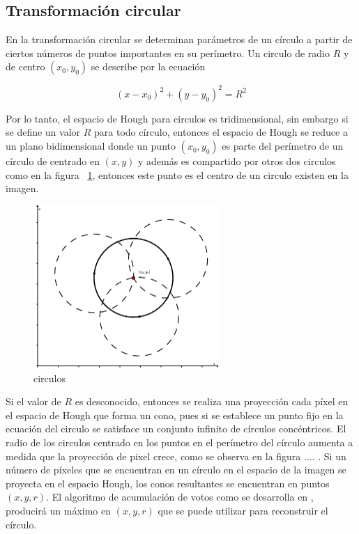 \subsection{Transformación circular}

En la transformación circular se determinan parámetros de un círculo a partir de ciertos números 
de puntos importantes en su perímetro. Un circulo de radio $R$ y de centro $(x_{0},y_{0})$ se describe por la ecuación 

\begin{equation}
(x-x_{0})^{2}+(y-y_{0})^{2}=R^{2}  
\end{equation}

Por lo tanto, el espacio de Hough para circulos es tridimensional, sin embargo si se define un valor $R$ para todo círculo, entonces el
espacio de Hough se reduce a un plano bidimensional donde un punto $(x_{0},y_{0})$ es parte del perímetro de un círculo de centrado en $(x,y)$ 
y además es compartido por otros dos circulos como en la figura ~\ref{fig:houghcircular}, entonces este punto es el centro de un circulo existen
en la imagen.

\begin{figure}[h]
 \centering
 \includegraphics[width=70mm]{./fig/houghcircular}
  \caption{circulos}
 \label{fig:houghcircular}
\end{figure}


Si el valor de $R$ es desconocido, entonces se realiza una proyección cada píxel en el espacio de Hough que forma un cono, pues si se establece un 
punto fijo en la ecuación del circulo se satisface un conjunto infinito de círculos concéntricos. El radio de los circulos centrado en los puntos
en el perímetro del círculo aumenta a medida que la proyección de pixel crece, como se observa en la figura .... .   Si un número de píxeles que 
se encuentran en un círculo en el espacio de la imagen se proyecta en el espacio Hough, los conos resultantes se encuentran en puntos $(x,y,r)$. 
El algoritmo de acumulación de votos como se desarrolla en \cite{Kimme1975}, producirá un máximo en $(x,y,r)$ que se puede utilizar para reconstruir el círculo.



